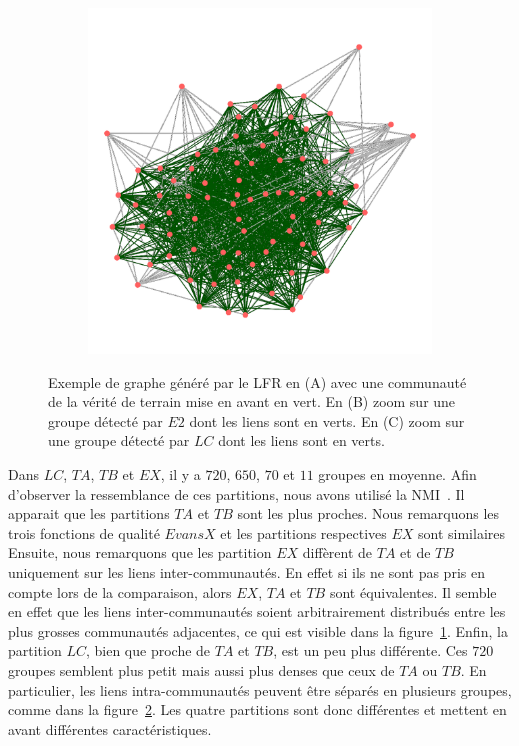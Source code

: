 \begin{figure}
\begin{subfigure}{0.31\textwidth}
		\caption{}
		\label{fig:LFR_ExempleE2}
	\end{subfigure}
	\begin{subfigure}{0.31\textwidth}
		\includegraphics[width=\linewidth]{img/ExpectedNodes/LF/Ahn.png}
		\caption{}
		\label{fig:LFR_ExempleLC}	
	\end{subfigure}

	\caption{Exemple de graphe généré par le LFR en (A) avec une communauté de la vérité de terrain mise en avant en vert.
	En (B) zoom sur une groupe détecté par $E2$ dont les liens sont en verts.
	En (C) zoom sur une groupe détecté par $LC$ dont les liens sont en verts. }
	\label{fig:LFR_Exemple}
\end{figure}


Dans $LC$, $TA$, $TB$ et $EX$, il y a $720$, $650$, $70$ et $11$ groupes en moyenne.
Afin d'observer la ressemblance de ces partitions, nous avons utilisé la NMI~\cite{Danon2005}.
Il apparait que les partitions $TA$ et $TB$ sont les plus proches.
Nous remarquons les trois fonctions de qualité $EvansX$ et les partitions respectives $EX$ sont similaires
Ensuite, nous remarquons que les partition $EX$ diffèrent de $TA$ et de $TB$ uniquement sur les liens inter-communautés.
En effet si ils ne sont pas pris en compte lors de la comparaison, alors $EX$, $TA$ et $TB$ sont équivalentes.
Il semble en effet que les liens inter-communautés soient arbitrairement distribués entre les plus grosses communautés adjacentes, ce qui est visible dans la figure~\ref{fig:LFR_ExempleE2}.
Enfin, la partition $LC$, bien que proche de $TA$ et $TB$, est un peu plus différente.
Ces $720$ groupes semblent plus petit mais aussi plus denses que ceux de $TA$ ou $TB$.
En particulier, les liens intra-communautés peuvent être séparés en plusieurs groupes, comme dans la figure~\ref{fig:LFR_ExempleLC}.
Les quatre partitions sont donc différentes et mettent en avant différentes caractéristiques.

